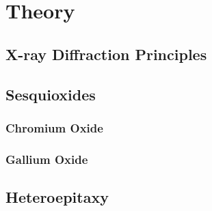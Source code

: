 \chapter{Theory}
\minitoc

\section{X-ray Diffraction Principles}
    
        \label{Sec:Theory_X-ray_diffraction}

\section{Sesquioxides}
    
    \subsection{Chromium Oxide}\label{Sec:Cr2O3}
        
    \subsection{Gallium Oxide}
        

\section{Heteroepitaxy}
    